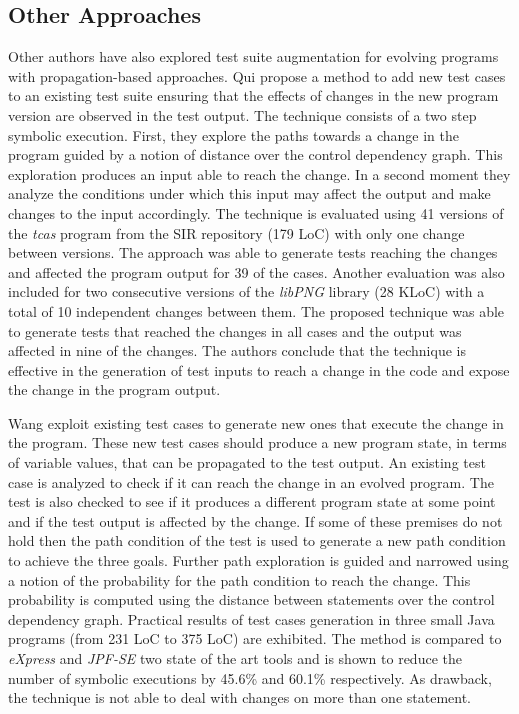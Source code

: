 \subsection{Other Approaches}
\label{subsec:sota:category-2:others-approach}

Other authors have also explored test suite augmentation for evolving programs with propagation-based approaches. 
Qui \etal\cite{qi2010test} propose a method to add new test cases to an existing test suite ensuring that the effects of changes in the new program version are observed in the test output. 
The technique consists of a two step symbolic execution. 
First, they explore the paths towards a change in the program guided by a notion of distance over the control dependency graph. 
This exploration produces an input able to reach the change. 
In a second moment they analyze the conditions under which this input may affect the output and make changes to the input accordingly. 
The technique is evaluated using 41 versions of the \emph{tcas} program from the SIR repository (179 LoC) with only one change between versions. 
The approach was able to generate tests reaching the changes and affected the program output for 39 of the cases. 
Another evaluation was also included for two consecutive versions of the \emph{libPNG} library (28 KLoC) with a total of 10 independent changes between them. 
The proposed technique was able to generate tests that reached the changes in all cases and the output was affected in nine of the changes. 
The authors conclude that the technique is effective in the generation of test inputs to reach a change in the code and expose the change in the program output.

Wang \etal\cite{xwang2014directed} exploit existing test cases to generate new ones that execute the change in the program. 
These new test cases should produce a new program state, in terms of variable values, that can be propagated to the test output. 
An existing test case is analyzed to check if it can reach the change in an evolved program. 
The test is also checked to see if it produces a different program state at some point and if the test output is affected by the change. 
If some of these premises do not hold then the path condition of the test is used to generate a new path condition to achieve the three goals. 
Further path exploration is guided and narrowed using a notion of the probability for the path condition to reach the change. 
This probability is computed using the distance between statements over the control dependency graph. 
Practical results of test cases generation in three small Java programs (from 231 LoC to 375 LoC) are exhibited. 
The method is compared to \emph{eXpress} and \emph{JPF-SE} two state of the art tools and is shown to reduce the number of symbolic executions by 45.6\% and 60.1\% respectively. 
As drawback, the technique is not able to deal with changes on more than one statement. 

